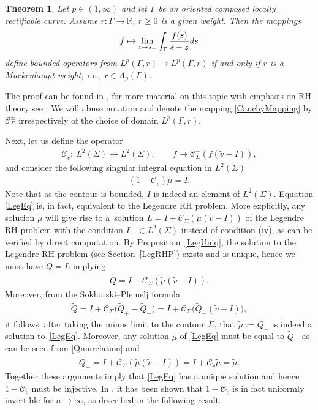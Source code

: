 \documentclass[11pt]{article}
\numberwithin{equation}{section}
\newcommand{\R}{\mathbb{R}}
\newcommand{\Id}{I}
\newcommand{\tQ}{{\widetilde Q}}
\newcommand{\tmu}{{\widetilde \mu}}
\newcommand{\tv}{{\widetilde v}}
\newcommand{\Cau}{\mathcal C_{\Sigma}}
\newcommand{\Cautv}{\mathcal C_{\tv}}
\newtheorem{Theorem}{Theorem}[section]
\numberwithin{equation}{section}
\begin{document}
\begin{Theorem}\label{Muckenhoupt}
Let $p\in(1, \infty)$ and let $\Gamma$ be an oriented composed locally rectifiable curve. Assume $r \colon \Gamma \to \R$, $r \geq 0$ is a given weight. Then the mappings
\begin{align}\label{CauchyMapping}
 f \mapsto \lim_{z\to s\pm} \int_\Gamma \frac{f(s)}{s-z} {\rm d}s
\end{align}
define bounded operators from $L^p(\Gamma, r) \to L^p(\Gamma, r)$ if and only if $r$ is a Muckenhoupt weight, i.e., $r\in A_p(\Gamma)$.
\end{Theorem}
The proof can be found in \cite[Theorem 4.15]{BK}, for more material on this topic with emphasis on RH theory see \cite{JL}. We will abuse notation and denote the mapping \eqref{CauchyMapping} by $\mathcal C^\pm_\Gamma$ irrespectively of the choice of domain $L^p(\Gamma, r)$.

Next, let us define the operator
\begin{align*}
 \Cautv \colon \ L^2(\Sigma) \to L^2(\Sigma), \qquad f \mapsto \Cau^-(f (\tv-\Id)),
\end{align*}
and consider the following singular integral equation in $L^2(\Sigma)$
\begin{align}\label{LegEq}
 (1-\Cautv)\tmu = \Id.
\end{align}
Note that as the contour is bounded, $\Id$ is indeed an element of $L^2(\Sigma)$. Equation \eqref{LegEq} is, in fact, equivalent to the Legendre RH problem. More explicitly, any solution $\tmu$ will give rise to a~solution $L = \Id + \Cau(\tmu(\tv -\Id))$ of the Legendre RH problem with the condition $L_\pm \in L^2(\Sigma)$ instead of condition (iv), as can be verified by direct computation. By Proposition~\ref{LegUniq}, the solution to the Legendre RH problem (see Section~\ref{LegRHP}) exists and is unique, hence we must have $\tQ = L$ implying
\begin{align}\label{Qmurelation}
 \tQ = \Id + \Cau(\tmu(\tv -\Id)).
\end{align}
Moreover, from the Sokhotski--Plemelj formula
\begin{align*}
 \tQ = \Id + \Cau\big(\tQ_+-\tQ_-\big) = \Id + \Cau\big(\tQ_-(\tv-\Id)\big),
\end{align*}
it follows, after taking the minus limit to the contour $\Sigma$, that $\tmu := \tQ_-$ is indeed a solution to~\eqref{LegEq}. Moreover, any solution $\tmu$ of \eqref{LegEq} must be equal to $\tQ_-$ as can be seen from \eqref{Qmurelation} and
\begin{align*}
 \tQ_- = \Id + \Cau^-(\tmu(\tv-\Id)) = \Id +\Cautv \tmu = \tmu.
\end{align*}
Together these arguments imply that \eqref{LegEq} has a unique solution and hence $1-\Cautv$ must be injective. In \cite{CD}, it has been shown that $1-\Cautv$ is in fact uniformly invertible for $n \to \infty$, as described in the following result.
\end{document}
